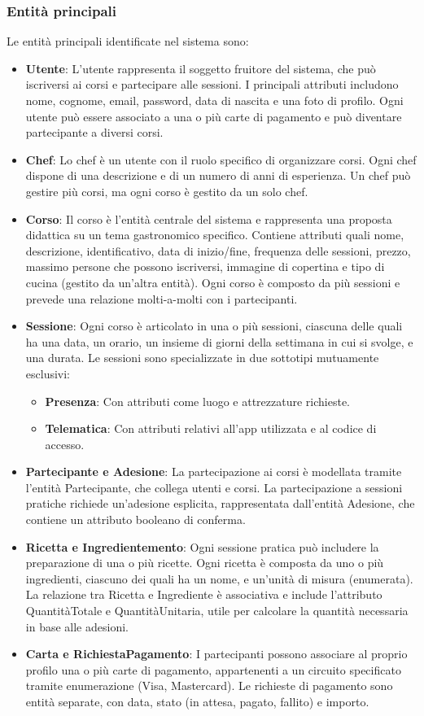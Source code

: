 \subsubsection{Entità principali}
Le entità principali identificate nel sistema sono:
\begin{itemize}
    \item \textbf{Utente}: L’utente rappresenta il soggetto fruitore del sistema, che può iscriversi ai corsi e partecipare alle sessioni. I principali attributi includono nome, cognome, email, password, data di nascita e una foto di profilo. Ogni utente può essere associato a una o più carte di pagamento e può diventare partecipante a diversi corsi.
    \item \textbf{Chef}: Lo chef è un utente con il ruolo specifico di organizzare corsi. Ogni chef dispone di una descrizione e di un numero di anni di esperienza. Un chef può gestire più corsi, ma ogni corso è gestito da un solo chef.
    \item \textbf{Corso}: Il corso è l'entità centrale del sistema e rappresenta una proposta didattica su un tema gastronomico specifico. Contiene attributi quali nome, descrizione, identificativo, data di inizio/fine, frequenza delle sessioni, prezzo, massimo persone che possono iscriversi, immagine di copertina e tipo di cucina (gestito da un'altra entità). Ogni corso è composto da più sessioni e prevede una relazione molti-a-molti con i partecipanti.
    \item \textbf{Sessione}: Ogni corso è articolato in una o più sessioni, ciascuna delle quali ha una data, un orario, un insieme di giorni della settimana in cui si svolge, e una durata. Le sessioni sono specializzate in due sottotipi mutuamente esclusivi:
    \begin{itemize}
        \item \textbf{Presenza}: Con attributi come luogo e attrezzature richieste.
        \item \textbf{Telematica}: Con attributi relativi all'app utilizzata e al codice di accesso.
    \end{itemize}
    \item \textbf{Partecipante e Adesione}: La partecipazione ai corsi è modellata tramite l’entità Partecipante, che collega utenti e corsi. La partecipazione a sessioni pratiche richiede un’adesione esplicita, rappresentata dall'entità Adesione, che contiene un attributo booleano di conferma.
    \item \textbf{Ricetta e Ingredientemento}: Ogni sessione pratica può includere la preparazione di una o più ricette. Ogni ricetta è composta da uno o più ingredienti, ciascuno dei quali ha un nome, e un'unità di misura (enumerata). La relazione tra Ricetta e Ingrediente è associativa e include l'attributo QuantitàTotale e QuantitàUnitaria, utile per calcolare la quantità necessaria in base alle adesioni.
    \item \textbf{Carta e RichiestaPagamento}: I partecipanti  possono associare al proprio profilo una o più carte di pagamento, appartenenti a un circuito specificato tramite enumerazione (Visa, Mastercard). Le richieste di pagamento sono entità separate, con data, stato (in attesa, pagato, fallito) e importo.
\end{itemize}
